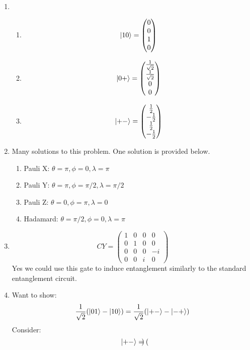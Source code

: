 \documentclass[12pt]{article}
\begin{document}
\begin{enumerate}[font=\bfseries]
    \item \begin{enumerate}
            \item \[\ket{10} = \begin{pmatrix} 0 \\ 0 \\ 1 \\0          \end{pmatrix}\]
            \item \[\ket{0+} = \begin{pmatrix} \frac{1}{\sqrt{2}} \\ \frac{1}{\sqrt{2}} \\ 0 \\0          \end{pmatrix}\]
            \item \[\ket{+-} = \begin{pmatrix} \frac{1}{2} \\ -\frac{1}{2} \\ \frac{1}{2} \\ -\frac{1}{2}         \end{pmatrix}\]
        \end{enumerate}
    \item Many solutions to this problem. One solution is provided below.
        \begin{enumerate}
            \item Pauli X: $\theta=\pi,\phi=0,\lambda=\pi$
            \item Pauli Y: $\theta=\pi,\phi=\pi/2,\lambda=\pi/2$
            \item Pauli Z: $\theta=0,\phi=\pi,\lambda=0$
            \item Hadamard: $\theta=\pi/2,\phi=0,\lambda=\pi$
        \end{enumerate}
    \item 
        \[CY = \begin{pmatrix} 
        1 & 0 & 0 & 0 \\
        0 & 1 & 0 & 0 \\
        0 & 0 & 0 & -i \\
        0 & 0 & i & 0
        \end{pmatrix} \]
        Yes we could use this gate to induce entanglement similarly to the standard entanglement circuit.
    \item Want to show:
    \[\frac{1}{\sqrt{2}}(\ket{01} - \ket{10}) = \frac{1}{\sqrt{2}}(\ket{+-} - \ket{-+})\]
    Consider:
    \[\ket{+-} = \begin{pmatrix}

\end{pmatrix}\]
\end{enumerate}
\end{document}
